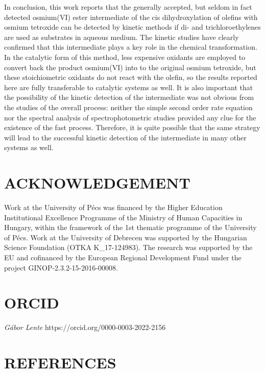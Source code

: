 \documentclass{article}
\begin{document}
In conclusion, this work reports that the generally accepted, but seldom in fact detected osmium(VI) ester intermediate of the cis dihydroxylation of olefins with osmium tetroxide can be detected by kinetic methods if di- and trichloroethylenes are used as substrates in aqueous medium. The kinetic studies have clearly confirmed that this intermediate plays a key role in the chemical transformation. In the catalytic form of this method, less expensive oxidants are employed to convert back the product osmium(VI) into to the original osmium tetroxide, but these stoichiometric oxidants do not react with the olefin, so the results reported here are fully transferable to catalytic systems as well. It is also important that the possibility of the kinetic detection of the intermediate was not obvious from the studies of the overall process: neither the simple second order rate equation nor the spectral analysis of spectrophotometric studies provided any clue for the existence of the fast process. Therefore, it is quite possible that the same strategy will lead to the successful kinetic detection of the intermediate in many other systems as well.

\section*{ACKNOWLEDGEMENT}

Work at the University of Pécs was financed by the Higher Education Institutional Excellence Programme of the Ministry of Human Capacities in Hungary, within the framework of the 1st thematic programme of the University of Pécs. Work at the University of Debrecen was supported by the Hungarian Science Foundation (OTKA K\_17-124983). The research was supported by the EU and cofinanced by the European Regional Development Fund under the project GINOP-2.3.2-15-2016-00008.

\section*{ORCID}

\noindent\emph{Gábor Lente} \quad https://orcid.org/0000-0003-2022-2156\par

\section*{REFERENCES}
\end{document}
